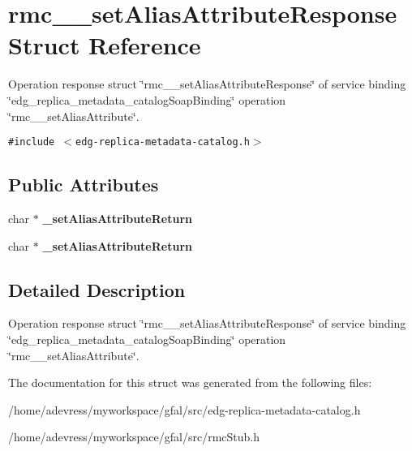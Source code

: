 \section{rmc\_\-\_\-set\-Alias\-Attribute\-Response Struct Reference}
\label{structrmc____setAliasAttributeResponse}
Operation response struct \char`\"{}rmc\_\-\_\-set\-Alias\-Attribute\-Response\char`\"{} of service binding \char`\"{}edg\_\-replica\_\-metadata\_\-catalog\-Soap\-Binding\char`\"{} operation \char`\"{}rmc\_\-\_\-set\-Alias\-Attribute\char`\"{}.  


{\tt \#include $<$edg-replica-metadata-catalog.h$>$}

\subsection*{Public Attributes}
\begin{CompactItemize}
\item 
char $\ast$ \textbf{\_\-set\-Alias\-Attribute\-Return}\label{structrmc____setAliasAttributeResponse_f72a9f2661888c89f4922d5e8bdd2f2f}

\item 
char $\ast$ \textbf{\_\-set\-Alias\-Attribute\-Return}\label{structrmc____setAliasAttributeResponse_f72a9f2661888c89f4922d5e8bdd2f2f}

\end{CompactItemize}


\subsection{Detailed Description}
Operation response struct \char`\"{}rmc\_\-\_\-set\-Alias\-Attribute\-Response\char`\"{} of service binding \char`\"{}edg\_\-replica\_\-metadata\_\-catalog\-Soap\-Binding\char`\"{} operation \char`\"{}rmc\_\-\_\-set\-Alias\-Attribute\char`\"{}. 



The documentation for this struct was generated from the following files:\begin{CompactItemize}
\item 
/home/adevress/myworkspace/gfal/src/edg-replica-metadata-catalog.h\item 
/home/adevress/myworkspace/gfal/src/rmc\-Stub.h\end{CompactItemize}
